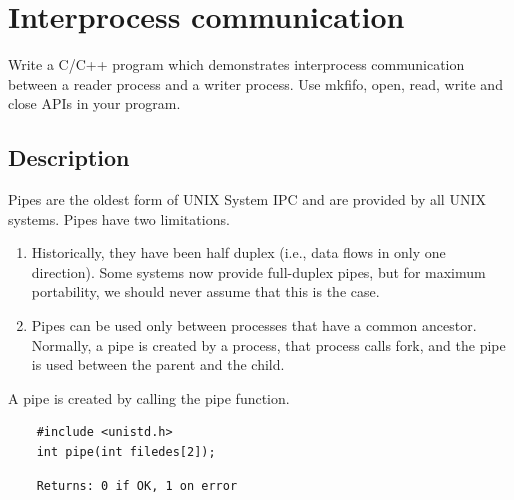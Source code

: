 \chapter{Interprocess communication}

Write a C/C++ program which demonstrates interprocess communication between a reader process and a writer process. Use mkfifo, open, read, write and close APIs in your program.

\section{Description}

Pipes are the oldest form of UNIX System IPC and are provided by all UNIX systems. Pipes have two limitations.
\begin{enumerate}
	\item Historically, they have been half duplex (i.e., data flows in only one direction). Some systems now provide full-duplex 		pipes, but for maximum portability, we should never assume that this is the case.
	\item Pipes can be used only between processes that have a common ancestor. Normally, a pipe is created by a process, that 		process calls fork, and the pipe is used between the parent and the child.
\end{enumerate}

A pipe is created by calling the pipe function.
\begin{lstlisting}
	#include <unistd.h>
	int pipe(int filedes[2]);
\end{lstlisting}

\begin{lstlisting}
	Returns: 0 if OK, 1 on error
\end{lstlisting}

